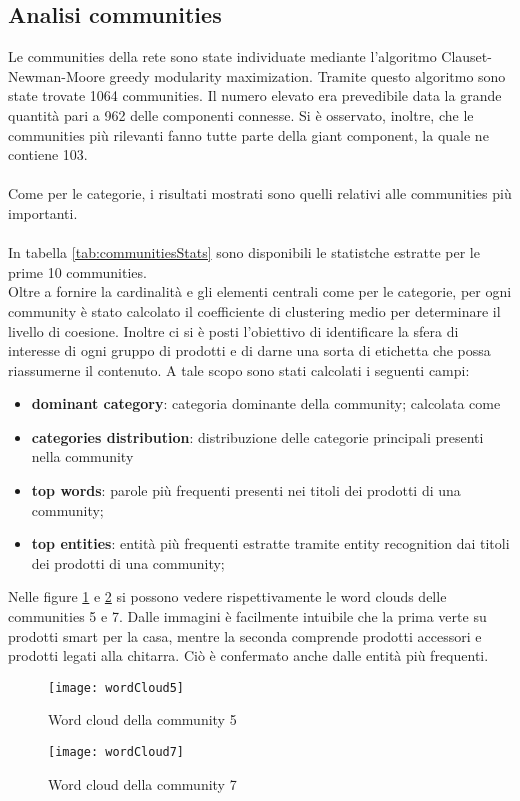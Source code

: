 \subsection{Analisi communities}
Le communities della rete sono state individuate mediante l'algoritmo Clauset-Newman-Moore greedy modularity maximization. Tramite questo algoritmo sono state trovate 1064 communities. Il numero elevato era prevedibile data la grande quantità pari a 962 delle componenti connesse. Si è osservato, inoltre, che le communities più rilevanti fanno tutte parte della giant component, la quale ne contiene 103. \\\\
Come per le categorie, i risultati mostrati sono quelli relativi alle communities più importanti. 
\\\\
In tabella \ref{tab:communitiesStats} sono disponibili le statistche estratte per le prime 10 communities. \\
Oltre a fornire la cardinalità e gli elementi centrali come per le categorie, per ogni community è stato calcolato il coefficiente di clustering medio per determinare il livello di coesione.  Inoltre ci si è posti l'obiettivo di identificare la sfera di interesse di ogni gruppo di prodotti e di darne una sorta di etichetta che possa riassumerne il contenuto. A tale scopo sono stati calcolati i seguenti campi:
\begin{itemize}
    \item \textbf{dominant category}: categoria dominante della community; calcolata come %
    \item \textbf{categories distribution}: distribuzione delle categorie principali presenti nella community
    \item \textbf{top words}: parole più frequenti presenti nei titoli dei prodotti di una community; %
    \item \textbf{top entities}: entità più frequenti estratte tramite entity recognition dai titoli dei prodotti di una community; %
\end{itemize}


Nelle figure \ref{fig:wordCloud5} e \ref{fig:wordCloud7} si possono vedere rispettivamente le word clouds delle communities 5 e 7. Dalle immagini è facilmente intuibile che la prima verte su prodotti smart per la casa, mentre la seconda comprende prodotti accessori e prodotti legati alla chitarra. Ciò è confermato anche dalle entità più frequenti.

\begin{figure}[]
    \texttt{[image: wordCloud5]}\centering
    \caption{Word cloud della community 5}\label{fig:wordCloud5}
\end{figure}
\begin{figure}[]
    \texttt{[image: wordCloud7]}\centering
    \caption{Word cloud della community 7}\label{fig:wordCloud7}
\end{figure}